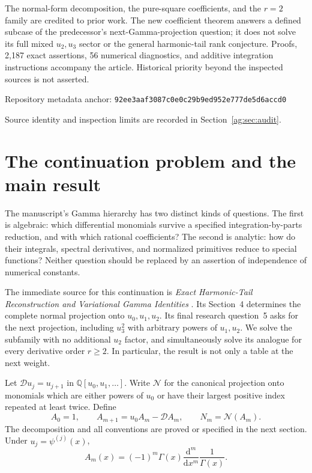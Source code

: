 \documentclass[11pt,letterpaper]{article}
\numberwithin{equation}{section}
\theoremstyle{definition}\newtheorem{definition}[theorem]{Definition}
\theoremstyle{remark}\newtheorem{remark}[theorem]{Remark}
\newcommand{\Q}{\mathbb Q}\newcommand{\C}{\mathbb C}\newcommand{\N}{\mathbb N}
\newcommand{\D}{\mathcal D}\newcommand{\NF}{\mathcal N}\newcommand{\Prim}{\mathcal T}
\newcommand{\pin}{92ee3aaf3087c0e0c29b9ed952e777de5d6accd0}
\begin{document}
\begin{titlepage}
\begin{minipage}{0.93\textwidth}
The normal-form decomposition, the pure-square coefficients, and the
$r=2$ family are credited to prior work. The new coefficient theorem
answers a defined subcase of the predecessor's next-Gamma-projection
question; it does not solve its full mixed $u_2,u_3$ sector or the general
harmonic-tail rank conjecture. Proofs, 2,187 exact assertions, 56 numerical
diagnostics, and additive integration instructions accompany the article.
Historical priority beyond the inspected sources is not asserted.
\end{minipage}
\vfill
{\small Repository metadata anchor: \texttt{\pin}\par}
{\small Source identity and inspection limits are recorded in Section~\ref{ag:sec:audit}.\par}
\end{titlepage}
\hypersetup{pageanchor=true}
{\small\setlength{\parskip}{0pt}\tableofcontents}
\clearpage{}

\section{The continuation problem and the main result}
\label{ag:sec:problem}

The manuscript's Gamma hierarchy has two distinct kinds of questions.
The first is algebraic: which differential monomials survive a specified
integration-by-parts reduction, and with which rational coefficients?
The second is analytic: how do their integrals, spectral derivatives,
and normalized primitives reduce to special functions? Neither question
should be replaced by an assertion of independence of numerical constants.

The immediate source for this continuation is \emph{Exact Harmonic-Tail
Reconstruction and Variational Gamma Identities} \cite{HTG}. Its
Section~4 determines the complete normal projection onto $u_0,u_1,u_2$.
Its final research question~5 asks for the next projection, including
$u_3^2$ with arbitrary powers of $u_1,u_2$. We solve the subfamily with
no additional $u_2$ factor, and simultaneously solve its analogue for
every derivative order $r\ge2$. In particular, the result is not only
a table at the next weight.

Let $\D u_j=u_{j+1}$ in $\Q[u_0,u_1,\ldots]$. Write $\NF$ for the
canonical projection onto monomials which are either powers of $u_0$
or have their largest positive index repeated at least twice. Define
\begin{equation}\label{ag:eq:hierarchy-intro}
 A_0=1,\qquad A_{m+1}=u_0A_m-\D A_m,\qquad N_m=\NF(A_m).
\end{equation}
The decomposition and all conventions are proved or specified in the
next section. Under $u_j=\psi^{(j)}(x)$,
\[
 A_m(x)=(-1)^m\Gamma(x)\frac{\mathrm d^m}{\mathrm dx^m}\frac1{\Gamma(x)}.
\]
\end{document}
